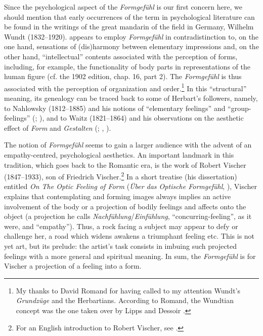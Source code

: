 \documentclass[output=paper]{langscibook}
\begin{document}
Since the psychological aspect of the \emph{Formgefühl} is our first concern here, we should mention that early occurrences of the term in psychological literature can be found in the writings of the great mandarin of the field in Germany, Wilhelm Wundt (1832--1920). \citet{Wundt1874} appears to employ \emph{Formgefühl} in contradistinction to, on the one hand, sensations of (dis)harmony between elementary impressions and, on the other hand, ``intellectual'' contents associated with the perception of forms, including, for example, the functionality of body parts in representations of the human figure (cf. the 1902 edition, chap. 16, part 2). The \emph{Formgefühl} is thus associated with the perception of organization and order.\footnote{My thanks to David Romand for having called to my attention Wundt’s \emph{Grundzüge} and the Herbartians. According to Romand, the Wundtian concept was the one taken over by Lipps and Dessoir \citep{RomandIP}.} In this ``structural'' meaning, its genealogy can be traced back to some of Herbart's followers, namely, to Nahlowsky (1812--1885) and his notions of ``elementary feelings'' and ``group-feelings'' (\citealt{Nahlowsky1862}; \citealt{Romand2018}), and to Waitz (1821--1864) and his observations on the aesthetic effect of \emph{Form} and \emph{Gestalten} (\citealt{Waitz1849}; \citealt{Romand2015}, \citealt{RomandIP}).

The notion of \emph{Formgefühl} seems to gain a larger audience with the advent of an empathy-centred, psychological aesthetics. An important landmark in this tradition, which goes back to the Romantic era, is the work of Robert Vischer (1847--1933), son of Friedrich Vischer.\footnote{For an English introduction to Robert Vischer, see \citet{Barasch1989}.} In a short treatise (his dissertation) entitled \emph{On The Optic Feeling of Form} (\emph{Über das Optische Formgefühl}, \citeyear{Vischer1873}), Vischer explains that contemplating and forming images always implies an active involvement of the body or a projection of bodily feelings and affects onto the object (a projection he calls \emph{Nachfühlung}/\emph{Einfühlung}, ``concurring-feeling'', as it were, and ``empathy''). Thus, a rock facing a subject may appear to defy or challenge her, a road which widens awakens a triumphant feeling etc. This is not yet art, but its prelude: the artist's task consists in imbuing such projected feelings with a more general and spiritual meaning. In sum, the \emph{Formgefühl} is for Vischer a projection of a feeling into a form.
\end{document}
